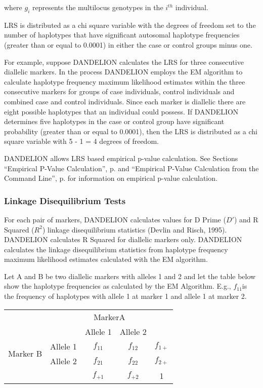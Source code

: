 \noindent{}where $g_i$ represents the multilocus genotypes in the $i^{th}$  individual.

LRS is distributed as a chi square variable with the degrees of freedom set to
the number of haplotypes that have significant autosomal haplotype frequencies
(greater than or equal to 0.0001) in either the case or control groups minus
one.


For example, suppose DANDELION calculates the LRS for three consecutive
diallelic markers.  In the process DANDELION employs the EM algorithm to
calculate haplotype frequency maximum likelihood estimates within the three
consecutive markers for groups of case individuals, control individuals and
combined case and control individuals.  Since each marker is diallelic there are
eight possible haplotypes that an individual could possess.  If DANDELION
determines five haplotypes in the case or control group have significant
probability (greater than or equal to 0.0001), then the LRS is distributed as a
chi square variable with 5 - 1 = 4 degrees of freedom.

DANDELION allows LRS based empirical p-value calculation.  See Sections
``Empirical P-Value Calculation'', p.\pageref{subsec:emp_p_val} and ``Empirical
P-Value Calculation from the Command Line'', p.\pageref{subsec:p_val_cmd_line} for
information on empirical p-value calculation.

\subsubsection{Linkage Disequilibrium Tests}

For each pair of markers, DANDELION calculates values for D Prime ($D'$) and R
Squared ($R^2$) linkage disequilibrium statistics (Devlin and Risch, 1995).
DANDELION calculates R Squared for diallelic markers only.  DANDELION calculates
the linkage disequilibrium statistics from haplotype frequency maximum
likelihood estimates calculated with the EM algorithm.  

Let A and B be two diallelic markers with alleles 1 and 2 and let the table
below show the haplotype frequencies as calculated by the EM Algorithm.  E.g.,
$f_{11}$is the frequency of haplotypes with allele 1 at marker 1 and allele 1 at marker
2.

\vspace{1em}
\begin{tabular}[!h]{ccccc}
  \hline
  & \multicolumn{4}{c}{MarkerA} \\
  \cline{2-5}
  \multirow{4}{*}{Marker B} & & Allele 1 & Allele 2 & \\
  & Allele 1 & $f_{11}$ & $f_{12}$ & $f_{1+}$ \\
  & Allele 2 & $f_{21}$ & $f_{22}$ & $f_{2+}$ \\
  &          & $f_{+1}$ & $f_{+2}$ & 1 \\
  \hline
\end{tabular}
\vspace{1em}

